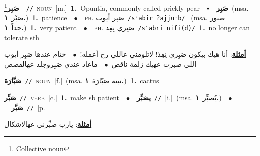 \documentclass[10pt,a4paper,twoside]{article} %
\begin{document}
\begin{multicols}{2}
{{{{{\setlength\topsep{0pt}\textbf{\foreignlanguage{arabic}{صَبِر}}\footnote{Collective noun}\ \ {\color{gray}\texttt{//}\color{black}}\ \textsc{noun}\ [m.]\ \textbf{1.}~Opuntia, commonly called prickly pear\ \ $\smblkdiamond$\ \ \setlength\topsep{0pt}\textbf{\foreignlanguage{arabic}{صَبِر}}\ \color{gray}(msa. \foreignlanguage{arabic}{صَبْر}~\foreignlanguage{arabic}{\textbf{١.}})\color{black}\ \textbf{1.}~patience\ \ $\bullet$\ \ \textsc{ph.} \color{gray} \foreignlanguage{arabic}{صَبِر أيوب}\color{black}\ {\color{gray}\texttt{/{\sffamily sˤabir ʔajjuːb}/}\color{black}}\ \color{gray} (msa. \foreignlanguage{arabic}{صبور جداً}~\foreignlanguage{arabic}{\textbf{١.}})\color{black}\ \textbf{1.}~very patient\ \ $\bullet$\ \ \textsc{ph.} \color{gray} \foreignlanguage{arabic}{صَبِري نِفِذ}\color{black}\ {\color{gray}\texttt{/{\sffamily sˤabri nifi(d)}/}\color{black}}\ \textbf{1.}~no longer can tolerate sth\  \begin{flushright}\color{gray}\foreignlanguage{arabic}{\textbf{\underline{\foreignlanguage{arabic}{أمثلة}}}: أنا هيك بيكون صَبِري نِفِذ! لاتلومني عاللي رح أعمله!\ $\bullet$\ \  ختام عندها صَبِر أيوب اللي صبرت عهيك زلمة ناقص\ $\bullet$\ \  ماعاد عندي صَبِروجلد عهالقصص}\end{flushright}\color{black}} \vspace{2mm}

{\setlength\topsep{0pt}\textbf{\foreignlanguage{arabic}{صَبَّارَة}}\ {\color{gray}\texttt{//}\color{black}}\ \textsc{noun}\ [f.]\ \color{gray}(msa. \foreignlanguage{arabic}{نبتة صَبّارَة}~\foreignlanguage{arabic}{\textbf{١.}})\color{black}\ \textbf{1.}~cactus\ 

{\setlength\topsep{0pt}\textbf{\foreignlanguage{arabic}{صَبِّر}}\ {\color{gray}\texttt{//}\color{black}}\ \textsc{verb}\ [c.]\ \textbf{1.}~make sb patient\ \ $\bullet$\ \ \setlength\topsep{0pt}\textbf{\foreignlanguage{arabic}{يصَبِّر}}\ {\color{gray}\texttt{//}\color{black}}\ [i.]\ \color{gray}(msa. \foreignlanguage{arabic}{يُصبِّر}~\foreignlanguage{arabic}{\textbf{١.}})\color{black}\ \ $\bullet$\ \ \setlength\topsep{0pt}\textbf{\foreignlanguage{arabic}{صَبَّر}}\ {\color{gray}\texttt{//}\color{black}}\ [p.]\  \begin{flushright}\color{gray}\foreignlanguage{arabic}{\textbf{\underline{\foreignlanguage{arabic}{أمثلة}}}: يارب صبِّرني عهالاشكال}\end{flushright}\color{black}} \vspace{2mm}

}}}}}
\end{multicols}
\end{document}

